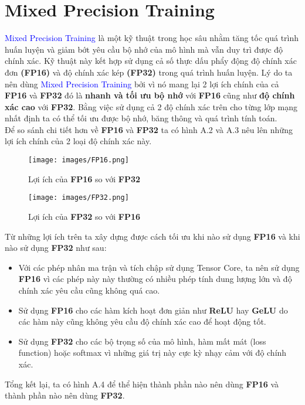 {\section{Mixed Precision Training}
\textcolor{blue}{Mixed Precision Training}\cite{micikevicius2018mixedprecisiontraining} là một kỹ thuật trong học sâu nhằm tăng tốc quá trình huấn luyện và giảm bớt yêu cầu bộ nhớ của mô hình mà vẫn duy trì được độ chính xác. Kỹ thuật này kết hợp sử dụng cả số thực dấu phẩy động độ chính xác đơn \textbf{(FP16)} và độ chính xác kép \textbf{(FP32)} trong quá trình huấn luyện. Lý do ta nên dùng \textcolor{blue}{Mixed Precision Training} bởi vì nó mang lại 2 lợi ích chính của cả \textbf{FP16} và \textbf{FP32} đó là \textbf{nhanh và tối ưu bộ nhớ} với \textbf{FP16} cũng như \textbf{độ chính xác cao} với \textbf{FP32}. Bằng việc sử dụng cả 2 độ chính xác trên cho từng lớp mạng nhất định ta có thể tối ưu được bộ nhớ, băng thông và quá trình tính toán. \\

Để so sánh chi tiết hơn về \textbf{FP16} và \textbf{FP32} ta có hình A.2 và A.3 nêu lên những lợi ích chính của 2 loại độ chính xác này.

\begin{figure}[h]
    \centering
    \texttt{[image: images/FP16.png]}
    \caption{Lợi ích của \textbf{FP16} so với \textbf{FP32}}
    \label{fig:your-label}
\end{figure} 

\begin{figure}[h]
    \centering
    \texttt{[image: images/FP32.png]}
    \caption{Lợi ích của \textbf{FP32} so với \textbf{FP16}}
    \label{fig:your-label}
\end{figure} 

Từ những lợi ích trên ta xây dựng được cách tối ưu khi nào sử dụng \textbf{FP16} và khi nào sử dụng \textbf{FP32} như sau:
\begin{itemize}
    \item Với các phép nhân ma trận và tích chập sử dụng Tensor Core, ta nên sử dụng \textbf{FP16} vì các phép này này thường có nhiều phép tính dung lượng lớn và độ chính xác yêu cầu cũng không quá cao.
    \item Sử dụng \textbf{FP16} cho các hàm kích hoạt đơn giản như \textbf{ReLU} hay \textbf{GeLU} do các hàm này cũng không yêu cầu độ chính xác cao để hoạt động tốt.
    \item Sử dụng \textbf{FP32} cho các bộ trọng số của mô hình, hàm mất mát (loss function) hoặc softmax vì những giá trị này cực kỳ nhạy cảm với độ chính xác.
\end{itemize}
Tổng kết lại, ta có hình A.4 để thể hiện thành phần nào nên dùng \textbf{FP16} và thành phần nào nên dùng \textbf{FP32}.

}
